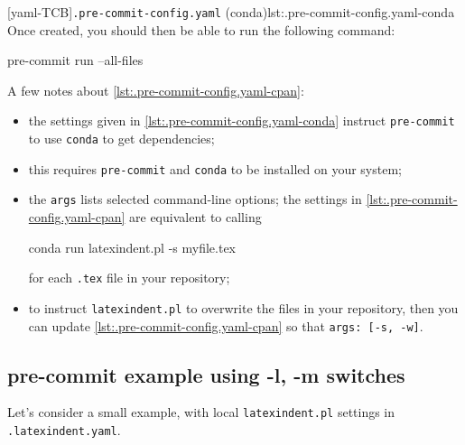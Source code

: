   [yaml-TCB]{\texttt{.pre-commit-config.yaml} (conda)}{lst:.pre-commit-config.yaml-conda}
  Once created, you should then be able to run the following command:
  \begin{commandshell}
pre-commit run --all-files  
\end{commandshell}
  A few notes about \cref{lst:.pre-commit-config.yaml-cpan}:
  \begin{itemize}
   \item the settings given in \cref{lst:.pre-commit-config.yaml-conda} instruct
         \texttt{pre-commit} to use \texttt{conda} to get dependencies;
   \item this requires \texttt{pre-commit} and \texttt{conda} to be installed on your system;
   \item the \texttt{args} lists selected command-line options; the settings in
         \cref{lst:.pre-commit-config.yaml-cpan} are equivalent to calling
         \begin{commandshell}
conda run latexindent.pl -s myfile.tex       
\end{commandshell}
         for each \texttt{.tex} file in your repository;
   \item to instruct \texttt{latexindent.pl} to overwrite the files in your repository, then you
         can update \cref{lst:.pre-commit-config.yaml-cpan} so that \texttt{args: [-s, -w]}.
  \end{itemize}

 \subsection{pre-commit example using -l, -m switches}
  Let's consider a small example, with local \texttt{latexindent.pl} settings in
  \texttt{.latexindent.yaml}.

